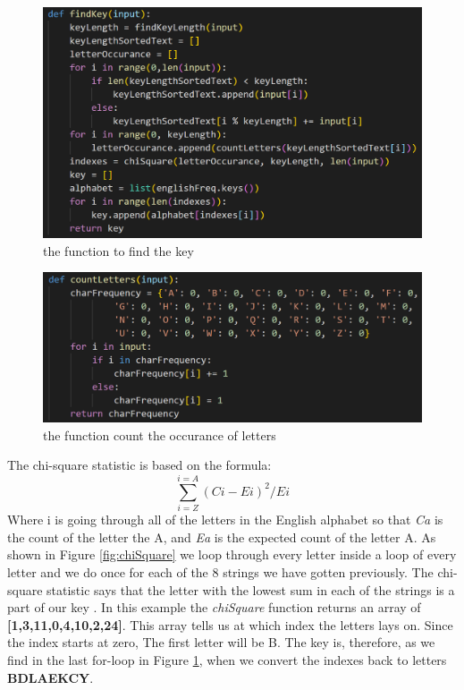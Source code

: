 \documentclass[12pt, letterpaper]{article}
\begin{document}
\begin{figure}[H]
  \includegraphics[width=\linewidth]{code_snippets/findKey.PNG}
  \caption{the function to find the key}
  \label{fig:findKey}
\end{figure}

\begin{figure}[H]
  \includegraphics[width=\linewidth]{code_snippets/countLetters.PNG}
  \caption{the function count the occurance of letters}
  \label{fig:countLetters}
\end{figure}

The chi-square statistic is based on the formula: 
$$\sum_{i = Z}^{i = A} (Ci - Ei)^{2}/Ei $$
Where i is going through all of the letters in the English alphabet so that \textit{Ca} is the count of the letter the A, and \textit{Ea} is the expected count of the letter A. As shown in Figure \ref{fig:chiSquare} we loop through every letter inside a loop of every letter and we do once for each of the 8 strings we have gotten previously. The chi-square statistic says that the letter with the lowest sum in each of the strings is a part of our key \cite{chi}. In this example the \textit{chiSquare} function returns an array of \textbf{[1,3,11,0,4,10,2,24]}. This array tells us at which index the letters lays on. Since the index starts at zero, The first letter will be B. The key is, therefore, as we find in the last for-loop in Figure \ref{fig:findKey}, when we convert the indexes back to letters \textbf{BDLAEKCY}. \\ \\
\end{document}
